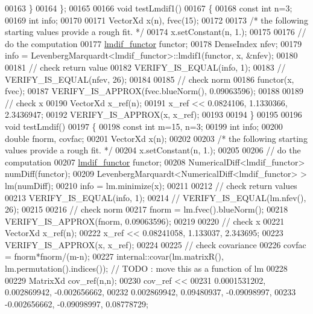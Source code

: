 \begin{DoxyCode}
00163     \}
00164 \};
00165 
00166 \textcolor{keywordtype}{void} testLmdif1()
00167 \{
00168   \textcolor{keyword}{const} \textcolor{keywordtype}{int} n=3;
00169   \textcolor{keywordtype}{int} info;
00170 
00171   VectorXd x(n), fvec(15);
00172 
00173   \textcolor{comment}{/* the following starting values provide a rough fit. */}
00174   x.setConstant(n, 1.);
00175 
00176   \textcolor{comment}{// do the computation}
00177   \hyperlink{structlmdif__functor}{lmdif\_functor} functor;
00178   DenseIndex nfev;
00179   info = LevenbergMarquardt<lmdif\_functor>::lmdif1(functor, x, &nfev);
00180 
00181   \textcolor{comment}{// check return value}
00182   VERIFY\_IS\_EQUAL(info, 1);
00183 \textcolor{comment}{//   VERIFY\_IS\_EQUAL(nfev, 26);}
00184 
00185   \textcolor{comment}{// check norm}
00186   functor(x, fvec);
00187   VERIFY\_IS\_APPROX(fvec.blueNorm(), 0.09063596);
00188 
00189   \textcolor{comment}{// check x}
00190   VectorXd x\_ref(n);
00191   x\_ref << 0.0824106, 1.1330366, 2.3436947;
00192   VERIFY\_IS\_APPROX(x, x\_ref);
00193 
00194 \}
00195 
00196 \textcolor{keywordtype}{void} testLmdif()
00197 \{
00198   \textcolor{keyword}{const} \textcolor{keywordtype}{int} m=15, n=3;
00199   \textcolor{keywordtype}{int} info;
00200   \textcolor{keywordtype}{double} fnorm, covfac;
00201   VectorXd x(n);
00202 
00203   \textcolor{comment}{/* the following starting values provide a rough fit. */}
00204   x.setConstant(n, 1.);
00205 
00206   \textcolor{comment}{// do the computation}
00207   \hyperlink{structlmdif__functor}{lmdif\_functor} functor;
00208   NumericalDiff<lmdif\_functor> numDiff(functor);
00209   LevenbergMarquardt<NumericalDiff<lmdif\_functor> > lm(numDiff);
00210   info = lm.minimize(x);
00211 
00212   \textcolor{comment}{// check return values}
00213   VERIFY\_IS\_EQUAL(info, 1);
00214 \textcolor{comment}{//   VERIFY\_IS\_EQUAL(lm.nfev(), 26);}
00215 
00216   \textcolor{comment}{// check norm}
00217   fnorm = lm.fvec().blueNorm();
00218   VERIFY\_IS\_APPROX(fnorm, 0.09063596);
00219 
00220   \textcolor{comment}{// check x}
00221   VectorXd x\_ref(n);
00222   x\_ref << 0.08241058, 1.133037, 2.343695;
00223   VERIFY\_IS\_APPROX(x, x\_ref);
00224 
00225   \textcolor{comment}{// check covariance}
00226   covfac = fnorm*fnorm/(m-n);
00227   internal::covar(lm.matrixR(), lm.permutation().indices()); \textcolor{comment}{// TODO : move this as a function of lm}
00228 
00229   MatrixXd cov\_ref(n,n);
00230   cov\_ref <<
00231       0.0001531202,   0.002869942,  -0.002656662,
00232       0.002869942,    0.09480937,   -0.09098997,
00233       -0.002656662,   -0.09098997,    0.08778729;

\end{DoxyCode}
